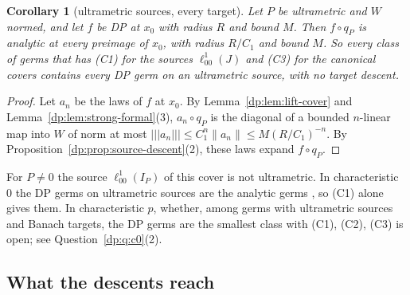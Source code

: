 \documentclass[11pt]{amsart}
\newtheorem{corollary}[theorem]{Corollary}
\theoremstyle{definition}
\theoremstyle{remark}
\numberwithin{equation}{section}
\newcommand{\norm}[1]{\lVert #1\rVert}
\theoremstyle{plain}
\theoremstyle{definition}
\theoremstyle{plain}
\begin{document}
\begin{corollary}[ultrametric sources, every target]\label{dp:cor:um-cover}
Let $P$ be ultrametric and $W$ normed, and let $f$ be DP at $x_0$ with radius $R$ and bound $M$. Then $f\circ q_P$ is analytic at every preimage of $x_0$, with radius $R/C_1$ and bound $M$. So every class of germs that has (C1) for the sources $\ell^1_{00}(J)$ and (C3) for the canonical covers contains every DP germ on an ultrametric source, with no target descent.
\end{corollary}

\begin{proof}
Let $a_n$ be the laws of $f$ at $x_0$. By Lemma~\ref{dp:lem:lift-cover} and Lemma~\ref{dp:lem:strong-formal}(3), $a_n\circ q_P$ is the diagonal of a bounded $n$-linear map into $W$ of norm at most $\lvert\!\lvert\!\lvert a_n\rvert\!\rvert\!\rvert\le C_1^n\norm{a_n}\le M(R/C_1)^{-n}$. By Proposition~\ref{dp:prop:source-descent}(2), these laws expand $f\circ q_P$.
\end{proof}

For $P\ne0$ the source $\ell^1_{00}(I_P)$ of this cover is not ultrametric. In characteristic $0$ the DP germs on ultrametric sources are the analytic germs \cite[Proposition~14.40(2)]{I}, so (C1) alone gives them. In characteristic $p$, whether, among germs with ultrametric sources and Banach targets, the DP germs are the smallest class with (C1), (C2), (C3) is open; see Question~\ref{dp:q:c0}(2).

\subsection{What the descents reach}\label{dp:ssec:reach}
\end{document}
